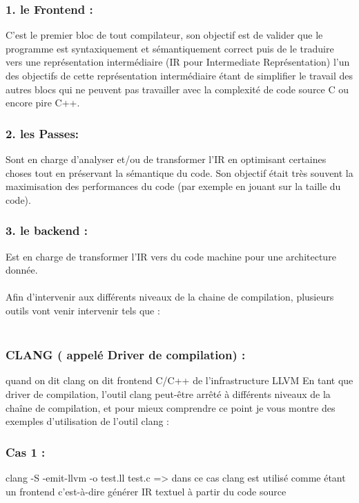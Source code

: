 \documentclass[12pt,titlepage]{report}
\begin{document}
     \subsubsection{ 1. le Frontend : }
     C'est le premier bloc de tout compilateur, son objectif est de valider que le programme est syntaxiquement et sémantiquement correct puis de le traduire vers une représentation intermédiaire (IR pour Intermediate Représentation) l'un des objectifs de cette représentation intermédiaire étant de simplifier le travail des autres blocs qui ne peuvent pas travailler avec la complexité de code source C ou encore pire C++. 

     \subsubsection{2. les Passes: }
     Sont en charge d’analyser et/ou de transformer l’IR en optimisant certaines choses tout en préservant la sémantique du code. Son objectif était très souvent la maximisation des performances du code (par exemple en jouant sur la taille du code).

    \subsubsection{3. le backend :}
    Est en charge de transformer l’IR vers du code machine pour une architecture donnée.\\

\\Afin d’intervenir aux différents niveaux de la chaine de compilation, plusieurs outils vont venir intervenir tels que :\\

   \\ \subsubsection{ CLANG ( appelé Driver de compilation) :} quand on dit clang on dit frontend C/C++ de l’infrastructure LLVM
En tant que driver de compilation, l’outil clang peut-être arrêté à différents niveaux de la chaîne de compilation, et pour mieux comprendre ce point je vous montre des exemples d’utilisation de l’outil clang :
      
\subsubsection {Cas 1 : } clang -S -emit-llvm -o test.ll test.c => dans ce cas clang est utilisé comme étant un frontend c'est-à-dire générer IR textuel à partir du code source 
      
\end{document}
